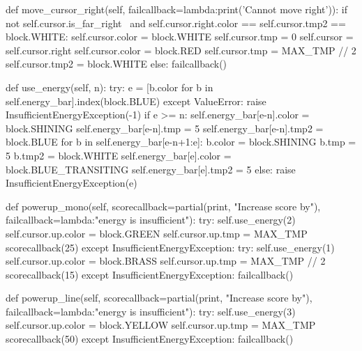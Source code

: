 \documentclass[UTF8]{article}
\begin{document}
\begin{python}
    def move_cursor_right(self, failcallback=lambda:print('Cannot move right')):
        if not self.cursor.is_far_right \
            and self.cursor.right.color == self.cursor.tmp2 == block.WHITE:
            self.cursor.color = block.WHITE
            self.cursor.tmp = 0
            self.cursor = self.cursor.right
            self.cursor.color = block.RED
            self.cursor.tmp = MAX_TMP // 2
            self.cursor.tmp2 = block.WHITE
        else:
            failcallback()
        
    def use_energy(self, n):
        try:
            e = [b.color for b in self.energy_bar].index(block.BLUE)
        except ValueError:
            raise InsufficientEnergyException(-1)
        if e >= n:
            self.energy_bar[e-n].color = block.SHINING
            self.energy_bar[e-n].tmp = 5
            self.energy_bar[e-n].tmp2 = block.BLUE
            for b in self.energy_bar[e-n+1:e]:
                b.color = block.SHINING
                b.tmp = 5
                b.tmp2 = block.WHITE
            self.energy_bar[e].color = block.BLUE_TRANSITING
            self.energy_bar[e].tmp2 = 5
        else:
            raise InsufficientEnergyException(e)
    
    def powerup_mono(self, scorecallback=partial(print, "Increase score by"), failcallback=lambda:"energy is insufficient"):
        try:
            self.use_energy(2)
            self.cursor.up.color = block.GREEN
            self.cursor.up.tmp = MAX_TMP
            scorecallback(25)
        except InsufficientEnergyException:
            try:
                self.use_energy(1)
                self.cursor.up.color = block.BRASS
                self.cursor.up.tmp = MAX_TMP // 2
                scorecallback(15)
            except InsufficientEnergyException:
                failcallback()
            
    def powerup_line(self, scorecallback=partial(print, "Increase score by"), failcallback=lambda:"energy is insufficient"):
        try:
            self.use_energy(3)
            self.cursor.up.color = block.YELLOW
            self.cursor.up.tmp = MAX_TMP
            scorecallback(50)
        except InsufficientEnergyException:
            failcallback()
        

\end{python}
\end{document}
